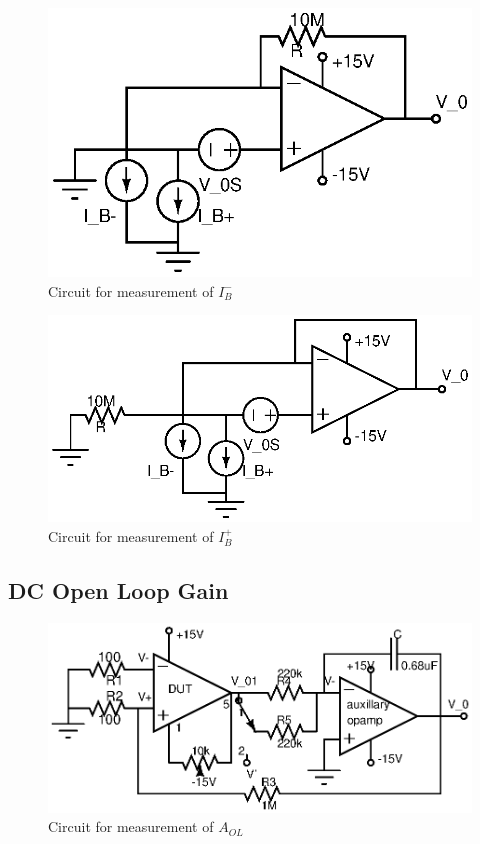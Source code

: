 \documentclass[12pt]{article}
\begin{document}
\begin{figure}[H]
    \centering
    \includegraphics[scale=1]{fig4.eps}
    \caption{Circuit for measurement of $I^-_B$}
    \label{fig:1b}
\end{figure}


\begin{figure}[H]
    \centering
    \includegraphics[scale=1]{fig6.eps}
    \caption{Circuit for measurement of $I^+_B$}
    \label{fig:1c}
\end{figure}


\subsection{DC Open Loop Gain}


\begin{figure}[H]
    \centering
    \includegraphics[scale=1]{fig8.eps}
    \caption{Circuit for measurement of $A_{OL}$}
    \label{fig:2}
\end{figure}
\end{document}
